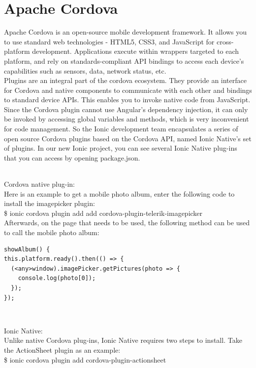 \section{Apache Cordova}
Apache Cordova is an open-source mobile development framework\cite{5}. It allows you to use standard web technologies - HTML5, CSS3, and JavaScript for cross-platform development. Applications execute within wrappers targeted to each platform, and rely on standards-compliant API bindings to access each device's capabilities such as sensors, data, network status, etc. \\ Plugins are an integral part of the cordova ecosystem. They provide an interface for Cordova and native components to communicate with each other and bindings to standard device APIs. This enables you to invoke native code from JavaScript. \\ Since the Cordova plugin cannot use Angular's dependency injection\cite{6}, it can only be invoked by accessing global variables and methods, which is very inconvenient for code management. So the Ionic development team encapsulates a series of open source Cordova plugins based on the Cordova API\cite{6}, named Ionic Native's set of plugins. In our new Ionic project, you can see several Ionic Native plug-ins that you can access by opening package.json. \\ \\ \item Cordova native plug-in: \\ Here is an example to get a mobile photo album, enter the following code to install the imagepicker plugin: \\ \$ ionic cordova plugin add add cordova-plugin-telerik-imagepicker \\ Afterwards\cite{6}, on the page that needs to be used, the following method can be used to call the mobile photo album: \\ \begin{verbatim}
showAlbum() {
this.platform.ready().then(() => {
  (<any>window).imagePicker.getPictures(photo => {
    console.log(photo[0]);
  });
});
\end{verbatim}
\\ \item Ionic Native: \\ Unlike native Cordova plug-ins, Ionic Native requires two steps to install. Take the ActionSheet plugin as an example: \\ \$ ionic cordova plugin add cordova-plugin-actionsheet \\
